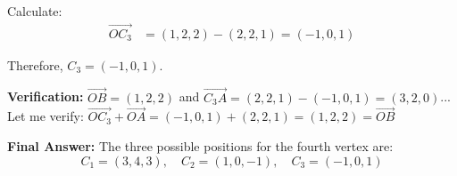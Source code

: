 \begin{solution}[Sketch]
Calculate:
\begin{align*}
\overrightarrow{OC_3} &= (1, 2, 2) - (2, 2, 1) = (-1, 0, 1)
\end{align*}

Therefore, $C_3 = (-1, 0, 1)$.

\textbf{Verification:} $\overrightarrow{OB} = (1,2,2)$ and $\overrightarrow{C_3A} = (2,2,1) - (-1,0,1) = (3,2,0)$... Let me verify: $\overrightarrow{OC_3} + \overrightarrow{OA} = (-1,0,1) + (2,2,1) = (1,2,2) = \overrightarrow{OB}$ \checkmark

\textbf{Final Answer:} The three possible positions for the fourth vertex are:
$$C_1 = (3, 4, 3), \quad C_2 = (1, 0, -1), \quad C_3 = (-1, 0, 1)$$
\end{solution}

\vspace{1em}
